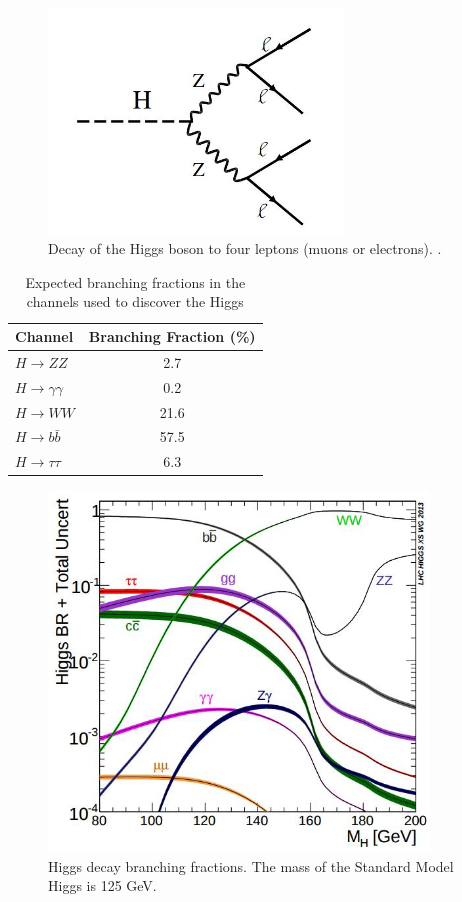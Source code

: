 \documentclass[oneside, letterpaper, oldfontcommands]{memoir}
\begin{document}
\begin{figure}[here]
\includegraphics[width=0.7\textwidth]{h4l.jpg}
\caption{Decay of the Higgs boson to four leptons (muons or electrons). .}
\label{fig:h4l}
\end{figure}

\begin{table}[htbp]
  \centering
  \begin{tabular}{ | l | c |}
    \hline
    Channel & Branching Fraction (\%) \\ \hline \hline
     $H \rightarrow ZZ$ & 2.7 \\ \hline
     $H \rightarrow \gamma\gamma$ & 0.2 \\ \hline
    $H \rightarrow WW$ & 21.6 \\ \hline
    $H \rightarrow b\bar{b}$ & 57.5 \\ \hline
    $H \rightarrow \tau\tau$ & 6.3\\ \hline
    
  \end{tabular}
  \caption{Expected branching fractions in the channels used to discover the Higgs\cite{Khachatryan:2016vau}}
  \label{tab:higgsbr}
\end{table}

\begin{figure}[here]
\includegraphics[width=0.9\textwidth]{higgsBR.jpg}
\caption{Higgs decay branching fractions\cite{Heinemeyer:2013tqa}. The mass of the Standard Model Higgs is 125 GeV. }
\label{fig:higgsBR}
\end{figure}
\end{document}
